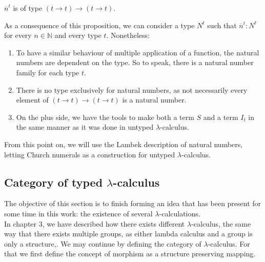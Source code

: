 \begin{remark}
  $\overline n^t$ is of type $(t\to t)\to(t\to t)$.
\end{remark}

As a consequence of this proposition, we can consider a type $N^t$ such that $\overline n^t:N^t$ for every $n\in\mathbb{N}$ and every type $t$. Nonetheless:
\begin{enumerate}

\item To have a similar behaviour of multiple application of a function, the natural numbers are dependent on the type. So to speak, there is a natural number family for each type $t$.
\item There is no type exclusively for natural numbers, as not necessarily every element of $(t\to t)\to(t\to t)$ is a natural number.
\item On the plus side, we have the tools to make both a term $S$ and a term $I_t$ in the same manner as it was done in untyped $\lambda$-calculus. \\
\end{enumerate}
From this point on, we will use the Lambek description of natural numbers, letting Church numerals as a construction for untyped $\lambda$-calculus.\\


\subsection{Category of typed $\lambda$-calculus}

The objective of this section is to finish forming an idea that has been present for some time in this work: the existence of several $\lambda$-calculations. \\

In chapter 3, we have described how there exists different $\lambda$-calculus, the same way that there exists multiple groups, as either lambda calculus and a group is only a structure,. We may continue by defining the category of $\lambda$-calculus. For that we first define the concept of morphism as a structure preserving mapping.



